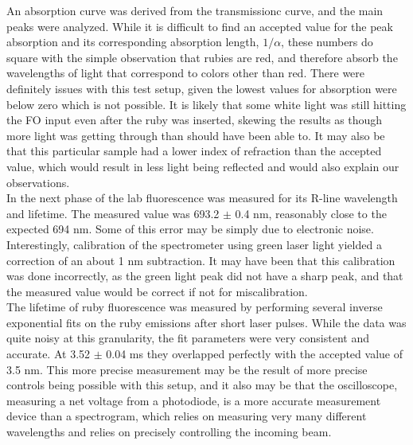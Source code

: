 \documentclass[aps,prl,reprint]{revtex4-2}
\begin{document}
An absorption curve was derived from the transmissionc curve, and the main peaks were
analyzed. While it is difficult to find an accepted value for the peak absorption
and its corresponding absorption length, $1/\alpha$, these numbers do square with
the simple observation that rubies are red, and therefore absorb the wavelengths of 
light that correspond to colors other than red. There were definitely issues with
this test setup, given the lowest values for absorption were below zero which is
not possible. It is likely that some white light was still hitting the FO input even 
after the ruby was inserted, skewing the results as though more light was getting 
through than should have been able to. It may also be that this particular sample
had a lower index of refraction than the accepted value, which would result in less
light being reflected and would also explain our observations.\\

In the next phase of the lab fluorescence was measured for its R-line wavelength and
lifetime. The measured value was 693.2 $\pm$ 0.4 nm, reasonably close to the expected
694 nm. Some of this error may be simply due to electronic noise. Interestingly, 
calibration of the spectrometer using green laser light yielded a correction of an 
about 1 nm subtraction. It may have been that this calibration was done incorrectly, as
the green light peak did not have a sharp peak, and that the measured value would be 
correct if not for miscalibration. \\

The lifetime of ruby fluorescence was measured by performing several inverse exponential
fits on the ruby emissions after short laser pulses. While the data was quite noisy
at this granularity, the fit parameters were very consistent and accurate. At 3.52 $\pm$
0.04 ms they overlapped perfectly with the accepted value of 3.5 nm. This more precise
measurement may be the result of more precise controls being possible with this setup,
and it also may be that the oscilloscope, measuring a net voltage from a photodiode,
is a more accurate measurement device than a spectrogram, which relies on measuring
very many different wavelengths and relies on precisely controlling the incoming beam.
\end{document}
